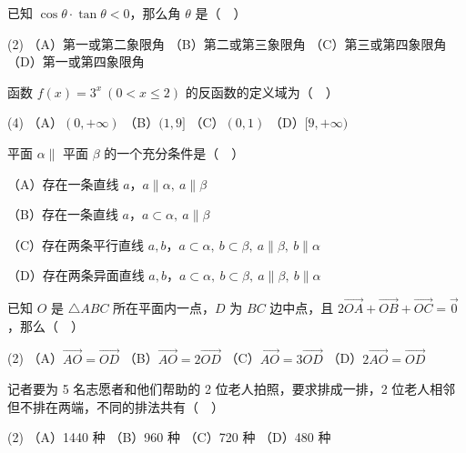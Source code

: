 


\begin{question}
已知 $\cos\theta\cdot\tan\theta<0$，那么角 $\theta$ 是（　）

\begin{gkopts}(2)
\task （A）第一或第二象限角
\task （B）第二或第三象限角
\task （C）第三或第四象限角
\task （D）第一或第四象限角
\end{gkopts}

\end{question}
\begin{question}
函数 $f(x)=3^x\ (0<x\leq 2)$ 的反函数的定义域为（　）

\begin{gkopts}(4)
\task （A）$(0,+\infty)$
\task （B）$(1,9]$
\task （C）$(0,1)$
\task （D）$[9,+\infty)$
\end{gkopts}

\end{question}
\begin{question}
平面 $\alpha\parallel$ 平面 $\beta$ 的一个充分条件是（　）

（A）存在一条直线 $a$，$a\parallel\alpha,\ a\parallel\beta$

（B）存在一条直线 $a$，$a\subset\alpha,\ a\parallel\beta$

（C）存在两条平行直线 $a,b$，$a\subset\alpha,\ b\subset\beta,\ a\parallel\beta,\ b\parallel\alpha$

（D）存在两条异面直线 $a,b$，$a\subset\alpha,\ b\subset\beta,\ a\parallel\beta,\ b\parallel\alpha$

\end{question}
\begin{question}
已知 $O$ 是 $\triangle ABC$ 所在平面内一点，$D$ 为 $BC$ 边中点，且
$2\overrightarrow{OA}+\overrightarrow{OB}+\overrightarrow{OC}=\vec{0}$，那么（　）

\begin{gkopts}(2)
\task （A）$\overrightarrow{AO}=\overrightarrow{OD}$
\task （B）$\overrightarrow{AO}=2\overrightarrow{OD}$
\task （C）$\overrightarrow{AO}=3\overrightarrow{OD}$
\task （D）$2\overrightarrow{AO}=\overrightarrow{OD}$
\end{gkopts}

\end{question}
\begin{question}
记者要为 5 名志愿者和他们帮助的 2 位老人拍照，要求排成一排，2 位老人相邻但不排在两端，不同的排法共有（　）

\begin{gkopts}(2)
\task （A）1440 种
\task （B）960 种
\task （C）720 种
\task （D）480 种
\end{gkopts}

\end{question}
